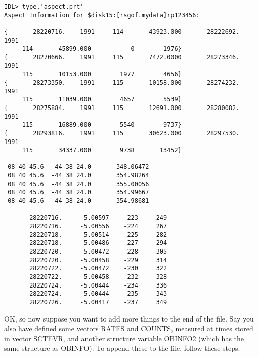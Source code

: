\medskip\noindent
\begin{verbatim}
IDL> type,'aspect.prt'
Aspect Information for $disk15:[rsgof.mydata]rp123456:
 
{       28220716.    1991     114       43923.000       28222692.    1991
     114       45899.000           0        1976}
{       28270666.    1991     115       7472.0000       28273346.    1991
     115       10153.000        1977        4656}
{       28273350.    1991     115       10158.000       28274232.    1991
     115       11039.000        4657        5539}
{       28275884.    1991     115       12691.000       28280082.    1991
     115       16889.000        5540        9737}
{       28293816.    1991     115       30623.000       28297530.    1991
     115       34337.000        9738       13452}
 
 08 40 45.6  -44 38 24.0       348.06472
 08 40 45.6  -44 38 24.0       354.98264
 08 40 45.6  -44 38 24.0       355.00056
 08 40 45.6  -44 38 24.0       354.99667
 08 40 45.6  -44 38 24.0       354.98681
 
       28220716.     -5.00597    -223     249
       28220716.     -5.00556    -224     267
       28220718.     -5.00514    -225     282
       28220718.     -5.00486    -227     294
       28220720.     -5.00472    -228     305
       28220720.     -5.00458    -229     314
       28220722.     -5.00472    -230     322
       28220722.     -5.00458    -232     328
       28220724.     -5.00444    -234     336
       28220724.     -5.00444    -235     343
       28220726.     -5.00417    -237     349
\end{verbatim}
OK, so now suppose you want to add more things to the end of the file. Say you
also have defined some vectors RATES and COUNTS, measured at times stored in
vector SCTEVR, and another structure variable OBINFO2 (which has the same
structure as OBINFO). To append these to the file, follow these steps:

